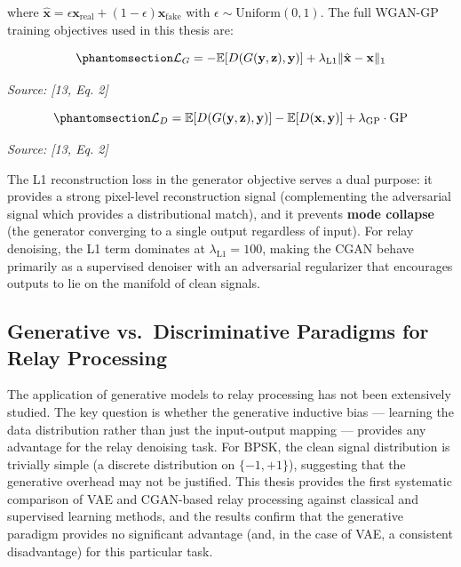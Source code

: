 where \(\hat{\mathbf{x}} = \epsilon \mathbf{x}_{\text{real}} + (1-\epsilon) \mathbf{x}_{\text{fake}}\) with \(\epsilon \sim \text{Uniform}(0, 1)\). The full WGAN-GP training objectives used in this thesis are:

\begin{equation}\protect\phantomsection\label{eq:wgan-gen-loss}{\mathcal{L}_G = -\mathbb{E}[D(G(\mathbf{y}, \mathbf{z}), \mathbf{y})] + \lambda_{\text{L1}} \|\hat{\mathbf{x}} - \mathbf{x}\|_1
}\end{equation} \par{\small\textit{Source: [13, Eq. 2]}}

\begin{equation}\protect\phantomsection\label{eq:wgan-disc-loss}{\mathcal{L}_D = \mathbb{E}[D(G(\mathbf{y}, \mathbf{z}), \mathbf{y})] - \mathbb{E}[D(\mathbf{x}, \mathbf{y})] + \lambda_{\text{GP}} \cdot \text{GP}
}\end{equation} \par{\small\textit{Source: [13, Eq. 2]}}

The L1 reconstruction loss in the generator objective serves a dual purpose: it provides a strong pixel-level reconstruction signal (complementing the adversarial signal which provides a distributional match), and it prevents \textbf{mode collapse} (the generator converging to a single output regardless of input). For relay denoising, the L1 term dominates at \(\lambda_{\text{L1}} = 100\), making the CGAN behave primarily as a supervised denoiser with an adversarial regularizer that encourages outputs to lie on the manifold of clean signals.

\subsection{Generative vs.~Discriminative Paradigms for Relay Processing}\label{sec:generative-vs.-discriminative-paradigms-for-relay-processing}

The application of generative models to relay processing has not been extensively studied. The key question is whether the generative inductive bias --- learning the data distribution rather than just the input-output mapping --- provides any advantage for the relay denoising task. For BPSK, the clean signal distribution is trivially simple (a discrete distribution on \(\{-1, +1\}\)), suggesting that the generative overhead may not be justified. This thesis provides the first systematic comparison of VAE and CGAN-based relay processing against classical and supervised learning methods, and the results confirm that the generative paradigm provides no significant advantage (and, in the case of VAE, a consistent disadvantage) for this particular task.


